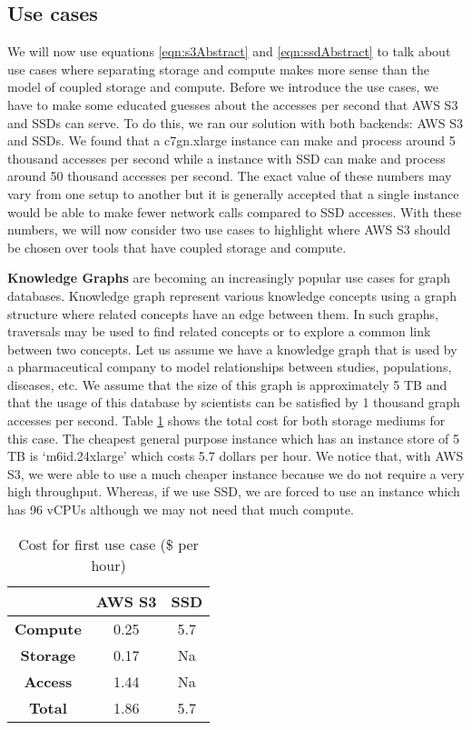 \subsection{Use cases}
We will now use equations \ref{eqn:s3Abstract} and \ref{eqn:ssdAbstract} to talk
about use cases where separating storage and compute makes more sense than the
model of coupled storage and compute. Before we introduce the use cases, we have
to make some educated guesses about the accesses per second that AWS S3 and SSDs
can serve. To do this, we ran our solution with both backends: AWS S3 and SSDs.
We found that a c7gn.xlarge instance can make and process around 5
thousand accesses per second while a instance with SSD can make and process
around 50 thousand accesses per second. The exact value of these numbers may
vary from one setup to another but it is generally accepted that a single
instance would be able to make fewer network calls compared to SSD accesses.
With these numbers, we will now consider two use cases to highlight where AWS S3
should be chosen over tools that have coupled storage and compute.

\medskip
\textbf{Knowledge Graphs} are becoming an increasingly popular use cases for
graph databases. Knowledge graph represent various knowledge concepts using a
graph structure where related concepts have an edge between them. In such
graphs, traversals may be used to find related concepts or to explore a common
link between two concepts. Let us assume we have a knowledge graph that is used
by a pharmaceutical company to model relationships between studies, populations,
diseases, etc. We assume that the size of this graph is approximately 5 TB and
that the usage of this database by scientists can be satisfied by 1 thousand
graph accesses per second. Table \ref{table:costKnowledgeGraphs} shows the total
cost for both storage mediums for this case. The cheapest general purpose
instance which has an instance store of 5 TB is `m6id.24xlarge' which costs 5.7
dollars per hour. We notice that, with AWS S3, we were able to use a much
cheaper instance because we do not require a very high throughput. Whereas, if
we use SSD, we are forced to use an instance which has 96 vCPUs although we may
not need that much compute.

\begin{table}[h!]
 \centering
 \begin{tabular}{|c | c | c |} 
 \hline
  & AWS S3 & SSD \\ [0.5ex] 
 \hline\hline
     \textbf{Compute} & 0.25 & 5.7 \\ 
     \textbf{Storage} & 0.17 & Na \\
     \textbf{Access} &  1.44 & Na \\
     \hline
     \textbf{Total} & 1.86 & 5.7 \\
 \hline
 \end{tabular}
 \caption{Cost for first use case (\$ per hour)}
 \label{table:costKnowledgeGraphs}
\end{table}

